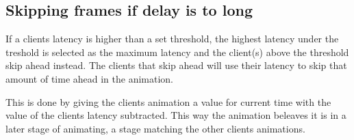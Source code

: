 \subsection{Skipping frames if delay is to long}
If a clients latency is higher than a set threshold, the highest latency under the treshold is selected as the maximum latency and the client(s) above the threshold skip ahead instead. The clients that skip ahead will use their latency to skip that amount of time ahead in the animation. 

This is done by giving the clients animation a value for current time with the value of the clients latency subtracted. This way the animation beleaves it is in a later stage of animating, a stage matching the other clients animations.


